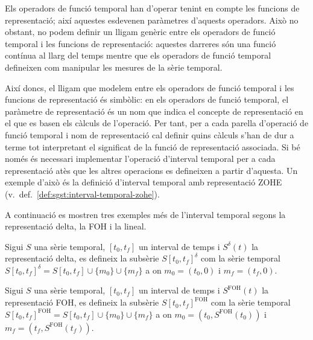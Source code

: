 Els operadors de funció temporal han d'operar tenint en compte les
funcions de representació; així aquestes esdevenen paràmetres
d'aquests operadors. Això no obstant, no podem definir un lligam
genèric entre els operadors de funció temporal i les funcions de
representació: aquestes darreres són una funció contínua al llarg del
temps mentre que els operadors de funció temporal defineixen com
manipular les mesures de la sèrie temporal.

Així doncs, el lligam que modelem entre els operadors de funció
temporal i les funcions de representació és simbòlic: en els operadors
de funció temporal, el paràmetre de representació és un nom que indica
el concepte de representació en el que es basen els càlculs de
l'operació. Per tant, per a cada parella d'operació de funció temporal
i nom de representació cal definir quins càlculs s'han de dur a terme
tot interpretant el significat de la funció de representació
associada. Si bé només és necessari implementar l'operació d'interval
temporal per a cada representació atès que les altres operacions es
defineixen a partir d'aquesta. Un exemple d'això és la definició
d'interval temporal amb representació ZOHE (v.\
def.~\ref{def:sgst:interval-temporal-zohe}).

A continuació es mostren tres exemples més de l'interval temporal
segons la representació delta, la FOH i la lineal.

\begin{definition}
  \label{def:sgst:interval-temporal-delta}
  Sigui $S$ una sèrie temporal, $[t_0,t_f]$ un interval de temps i
  $S^\delta(t)$ la representació delta, es defineix la subsèrie
  $S[t_0,t_f]^\delta$ com la sèrie temporal
  $S[t_0,t_f]^\delta = S[t_0,t_f] \cup \{m_0\} \cup \{m_f\}$ a
  on $m_0=(t_0,0)$ i $m_f=(t_f,0)$.
\end{definition}

\begin{definition}
  \label{def:sgst:interval-temporal-foh}
  Sigui $S$ una sèrie temporal, $[t_0,t_f]$ un interval de temps i
  $S^\text{FOH}(t)$ la representació FOH, es defineix la subsèrie
  $S[t_0,t_f]^{\text{FOH}}$ com la sèrie temporal
  $S[t_0,t_f]^{\text{FOH}} = S[t_0,t_f] \cup \{m_0\} \cup \{m_f\}$ a
  on $m_0=(t_0,S^{\text{FOH}}(t_0))$ i $m_f=(t_f,S^{\text{FOH}}(t_f))$.
\end{definition}

